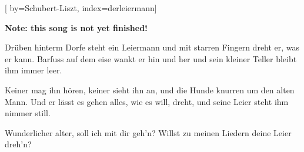 
[%
    by={Schubert-Liszt},
    index={derleiermann}]


    \label{derleiermann}

    \textbf{Note: this song is not yet finished!}

    \beginverse
        Drüben hinterm Dorfe steht ein Leiermann
        und mit starren Fingern dreht er, was er kann.
        Barfuss auf dem eise wankt er hin und her
        und sein kleiner Teller bleibt ihm immer leer.
    \endverse

    \beginverse
        Keiner mag ihn hören, keiner sieht ihn an,
        und die Hunde knurren um den alten Mann.
        Und er lässt es gehen alles, wie es will,
        dreht, und seine Leier steht ihm nimmer still.
    \endverse

    \beginverse*
        Wunderlicher alter, soll ich mit dir geh'n?
        Willst zu meinen Liedern deine Leier dreh'n?
    \endverse
\endsong
